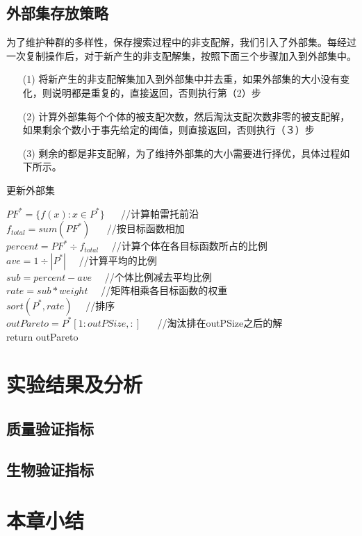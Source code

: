     \subsection{外部集存放策略}
    为了维护种群的多样性，保存搜索过程中的非支配解，我们引入了外部集。每经过一次复制操作后，对于新产生的非支配解集，按照下面三个步骤加入到外部集中。
    \begin{enumerate}
       \item[(1)] 将新产生的非支配解集加入到外部集中并去重，如果外部集的大小没有变化，则说明都是重复的，直接返回，否则执行第（2）步
       \item[(2)] 计算外部集每个个体的被支配次数，然后淘汰支配次数非零的被支配解，如果剩余个数小于事先给定的阈值，则直接返回，否则执行（３）步
       \item[(3)] 剩余的都是非支配解，为了维持外部集的大小需要进行择优，具体过程如下所示。
    \end{enumerate} 
    \begin{algorithm}[htbp]
        \caption{更新外部集} \label{alg:updatePareto}
        $PF^*= \{f(x):x\in P^*\}$ 　 //计算帕雷托前沿 \\
        $f_{total} = sum(PF^*)$  　 //按目标函数相加\\
        $percent = PF^* \div　f_{total} $　 //计算个体在各目标函数所占的比例\\
        $ave = 1 \div |P^*|$　 //计算平均的比例\\
        $sub = percent - ave$　 //个体比例减去平均比例 \\
        $rate = sub \ast weight$　 //矩阵相乘各目标函数的权重\\
        $sort(P^*, rate)$　 //排序\\
        $outPareto = P^*[1:outPSize,:]$ 　 //淘汰排在outPSize之后的解\\
        return outPareto
    \end{algorithm}
\section{实验结果及分析}
    \subsection{质量验证指标}

    \subsection{生物验证指标}

\section{本章小结}